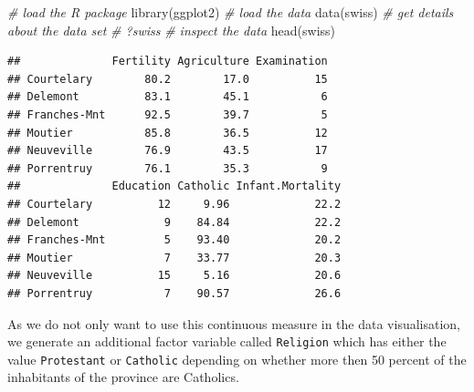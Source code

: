 \documentclass[
  12pt,
]{style/krantz}
\newenvironment{Shaded}{\begin{snugshade}}{\end{snugshade}}
\newcommand{\CommentTok}[1]{\textcolor[rgb]{0.56,0.35,0.01}{\textit{#1}}}
\newcommand{\DecValTok}[1]{\textcolor[rgb]{0.00,0.00,0.81}{#1}}
\newcommand{\FunctionTok}[1]{\textcolor[rgb]{0.00,0.00,0.00}{#1}}
\newcommand{\NormalTok}[1]{#1}
\newcommand{\OtherTok}[1]{\textcolor[rgb]{0.56,0.35,0.01}{#1}}
\newcommand{\SpecialCharTok}[1]{\textcolor[rgb]{0.00,0.00,0.00}{#1}}
\newcommand{\StringTok}[1]{\textcolor[rgb]{0.31,0.60,0.02}{#1}}
\begin{document}
\begin{Shaded}
\begin{Highlighting}[]
\CommentTok{\# load the R package}
\FunctionTok{library}\NormalTok{(ggplot2)}
\CommentTok{\# load the data}
\FunctionTok{data}\NormalTok{(swiss)}
\CommentTok{\# get details about the data set}
\CommentTok{\# ?swiss}
\CommentTok{\# inspect the data}
\FunctionTok{head}\NormalTok{(swiss)}
\end{Highlighting}
\end{Shaded}

\begin{verbatim}
##              Fertility Agriculture Examination
## Courtelary        80.2        17.0          15
## Delemont          83.1        45.1           6
## Franches-Mnt      92.5        39.7           5
## Moutier           85.8        36.5          12
## Neuveville        76.9        43.5          17
## Porrentruy        76.1        35.3           9
##              Education Catholic Infant.Mortality
## Courtelary          12     9.96             22.2
## Delemont             9    84.84             22.2
## Franches-Mnt         5    93.40             20.2
## Moutier              7    33.77             20.3
## Neuveville          15     5.16             20.6
## Porrentruy           7    90.57             26.6
\end{verbatim}

As we do not only want to use this continuous measure in the data visualisation, we generate an additional factor variable called \texttt{Religion} which has either the value \texttt{\textquotesingle{}Protestant\textquotesingle{}} or \texttt{\textquotesingle{}Catholic\textquotesingle{}} depending on whether more then 50 percent of the inhabitants of the province are Catholics.

\begin{Shaded}
\end{Shaded}
\end{document}
